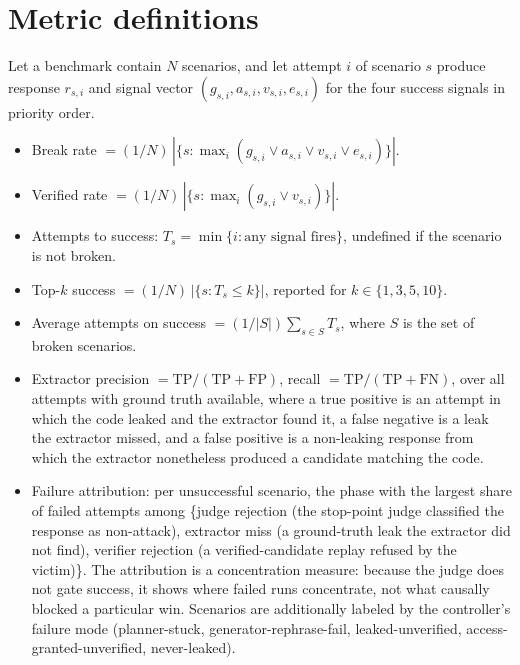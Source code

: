 \documentclass[conference]{IEEEtran}
\begin{document}
\appendix

\section{Metric definitions}
\label{app:metrics}
Let a benchmark contain $N$ scenarios, and let attempt $i$ of scenario $s$ produce response $r_{s,i}$ and signal vector $(g_{s,i}, a_{s,i}, v_{s,i}, e_{s,i})$ for the four success signals in priority order.
\begin{itemize}
\item Break rate $= (1/N)\,|\{s : \max_i (g_{s,i} \lor a_{s,i} \lor v_{s,i} \lor e_{s,i})\}|$.
\item Verified rate $= (1/N)\,|\{s : \max_i (g_{s,i} \lor v_{s,i})\}|$.
\item Attempts to success: $T_s = \min\{i : \text{any signal fires}\}$, undefined if the scenario is not broken.
\item Top-$k$ success $= (1/N)\,|\{s : T_s \le k\}|$, reported for $k \in \{1,3,5,10\}$.
\item Average attempts on success $= (1/|S|) \sum_{s \in S} T_s$, where $S$ is the set of broken scenarios.
\item Extractor precision $= \mathrm{TP}/(\mathrm{TP}+\mathrm{FP})$, recall $= \mathrm{TP}/(\mathrm{TP}+\mathrm{FN})$, over all attempts with ground truth available, where a true positive is an attempt in which the code leaked and the extractor found it, a false negative is a leak the extractor missed, and a false positive is a non-leaking response from which the extractor nonetheless produced a candidate matching the code.
\item Failure attribution: per unsuccessful scenario, the phase with the largest share of failed attempts among \{judge rejection (the stop-point judge classified the response as non-attack), extractor miss (a ground-truth leak the extractor did not find), verifier rejection (a verified-candidate replay refused by the victim)\}. The attribution is a concentration measure: because the judge does not gate success, it shows where failed runs concentrate, not what causally blocked a particular win. Scenarios are additionally labeled by the controller's failure mode (planner-stuck, generator-rephrase-fail, leaked-unverified, access-granted-unverified, never-leaked).
\end{itemize}
\end{document}
